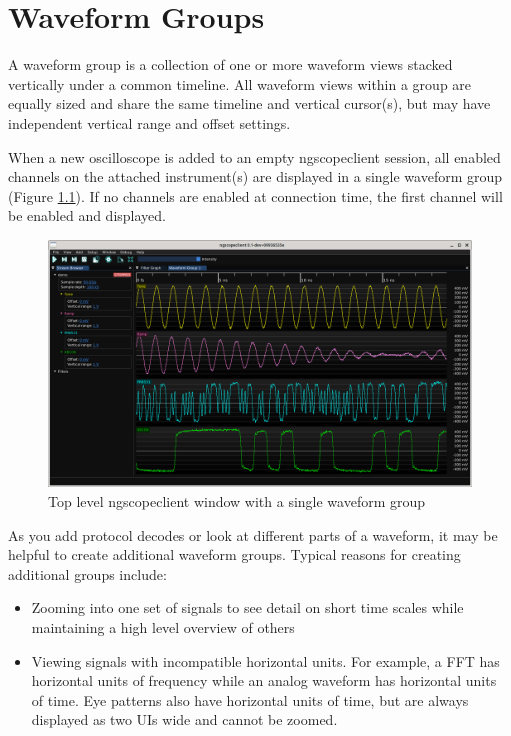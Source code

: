 \chapter{Waveform Groups}

A waveform group is a collection of one or more waveform views stacked vertically under a common timeline. All waveform
views within a group are equally sized and share the same timeline and vertical cursor(s), but may have independent
vertical range and offset settings.

When a new oscilloscope is added to an empty ngscopeclient session, all enabled channels on the attached instrument(s)
are displayed in a single waveform group (Figure \ref{single-group}). If no channels are enabled at connection time,
the first channel will be enabled and displayed.

\begin{figure}[h]
\centering
\includegraphics[width=13cm]{ng-images/overview.png}
\caption{Top level ngscopeclient window with a single waveform group}
\label{single-group}
\end{figure}

As you add protocol decodes or look at different parts of a waveform, it may be helpful to create additional waveform
groups. Typical reasons for creating additional groups include:

\begin{itemize}
\item Zooming into one set of signals to see detail on short time scales while maintaining a high level overview of
others
\item Viewing signals with incompatible horizontal units. For example, a FFT has horizontal units of frequency while an
analog waveform has horizontal units of time. Eye patterns also have horizontal units of time, but are always displayed
as two UIs wide and cannot be zoomed.
\end{itemize}

